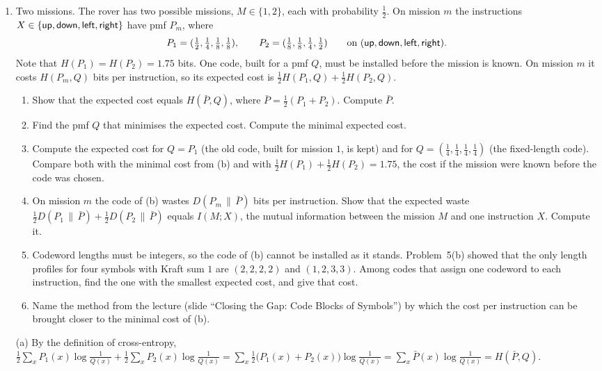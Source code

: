 \begin{enumerate}[resume*=quiz]
\item Two missions. The rover has two possible missions, $M\in\{1,2\}$, each with probability $\tfrac12$. On mission $m$ the instructions $X\in\{\textsf{up},\textsf{down},\textsf{left},\textsf{right}\}$ have pmf $P_m$, where
\[
P_1=(\tfrac12,\tfrac14,\tfrac18,\tfrac18),\qquad P_2=(\tfrac18,\tfrac18,\tfrac14,\tfrac12)\qquad\text{on }(\textsf{up},\textsf{down},\textsf{left},\textsf{right}).
\]
Note that $H(P_1)=H(P_2)=1.75$ bits. One code, built for a pmf $Q$, must be installed before the mission is known. On mission $m$ it costs $H(P_m,Q)$ bits per instruction, so its expected cost is $\tfrac12H(P_1,Q)+\tfrac12H(P_2,Q)$.
\begin{enumerate}[label=(\alph*),leftmargin=2em]
\item Show that the expected cost equals $H(\bar P,Q)$, where $\bar P=\tfrac12(P_1+P_2)$. Compute $\bar P$.
\item Find the pmf $Q$ that minimises the expected cost. Compute the minimal expected cost.
\item Compute the expected cost for $Q=P_1$ (the old code, built for mission $1$, is kept) and for $Q=(\tfrac14,\tfrac14,\tfrac14,\tfrac14)$ (the fixed-length code). Compare both with the minimal cost from (b) and with $\tfrac12H(P_1)+\tfrac12H(P_2)=1.75$, the cost if the mission were known before the code was chosen.
\item On mission $m$ the code of (b) wastes $D(P_m\,\|\,\bar P)$ bits per instruction. Show that the expected waste $\tfrac12D(P_1\,\|\,\bar P)+\tfrac12D(P_2\,\|\,\bar P)$ equals $I(M;X)$, the mutual information between the mission $M$ and one instruction $X$. Compute it.
\item Codeword lengths must be integers, so the code of (b) cannot be installed as it stands. Problem~5(b) showed that the only length profiles for four symbols with Kraft sum $1$ are $(2,2,2,2)$ and $(1,2,3,3)$. Among codes that assign one codeword to each instruction, find the one with the smallest expected cost, and give that cost.
\item Name the method from the lecture (slide ``Closing the Gap: Code Blocks of Symbols'') by which the cost per instruction can be brought closer to the minimal cost of (b).
\end{enumerate}
\begin{solution}
(a) By the definition of cross-entropy,
$\tfrac12\sum_xP_1(x)\log\frac1{Q(x)}+\tfrac12\sum_xP_2(x)\log\frac1{Q(x)}=\sum_x\tfrac12\big(P_1(x)+P_2(x)\big)\log\frac1{Q(x)}=\sum_x\bar P(x)\log\frac1{Q(x)}=H(\bar P,Q)$.


\end{solution}
\end{enumerate}
